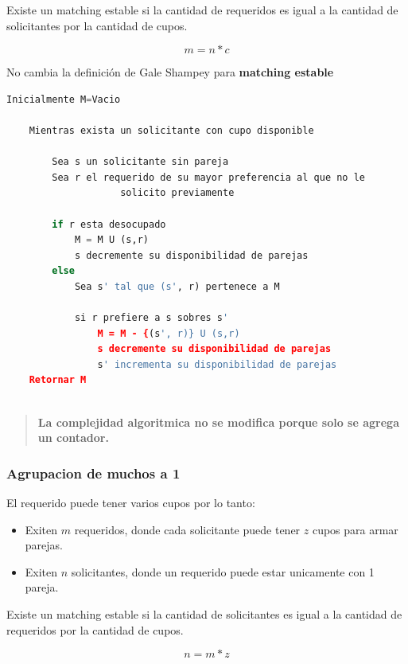 \documentclass{article}
\begin{document}
Existe un matching estable si la cantidad de requeridos es igual a la cantidad de solicitantes por la cantidad de cupos.

\begin{equation} \label{eu_eqn}
    m=n*c
\end{equation}

No cambia la definición de Gale Shampey para \textbf{matching estable}

\begin{lstlisting}[language=Python, caption=Algoritmo de solicitantes con cupos]
    Inicialmente M=Vacio
    
    Mientras exista un solicitante con cupo disponible
    
        Sea s un solicitante sin pareja
        Sea r el requerido de su mayor preferencia al que no le
                    solicito previamente
            
        if r esta desocupado
            M = M U (s,r)
            s decremente su disponibilidad de parejas
        else
            Sea s' tal que (s', r) pertenece a M

            si r prefiere a s sobres s'
                M = M - {(s', r)} U (s,r)
                s decremente su disponibilidad de parejas
                s' incrementa su disponibilidad de parejas
    Retornar M
    
\end{lstlisting}    
\begin{quote}
    \textbf{La complejidad algoritmica no se modifica porque solo se agrega un contador.}
\end{quote}

\newpage
\subsubsection{Agrupacion de muchos a 1}
El requerido puede tener varios cupos por lo tanto:
\begin{itemize}
    \item Exiten \(m\) requeridos, donde cada solicitante puede tener \(z\) cupos para armar parejas.
    \item Exiten \(n\) solicitantes, donde un requerido puede estar unicamente con 1 pareja.
\end{itemize}

Existe un matching estable si la cantidad de solicitantes es igual a la cantidad de requeridos por la cantidad de cupos.

\begin{equation} \label{eu_eqn}
    n=m*z
\end{equation}
\end{document}
